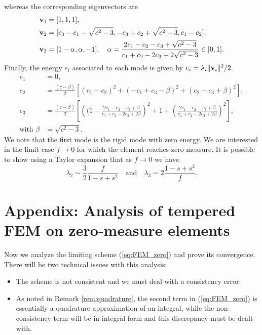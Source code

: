 \documentclass{article}
\theoremstyle{remark}
\begin{document}
whereas the corresponding eigenvectors are
\begin{align}
    {\bf v}_1 & = [ 1, 1, 1], \nonumber \\
    {\bf v}_2 & = [ c_3 - c_1 - \sqrt{c^2 - 3}, -c_3 + c_2 + \sqrt{c^2 - 3} , c_1 - c_2], \nonumber \\
    {\bf v}_3 & = [ 1 - \alpha,  \alpha, -1], \quad \alpha = \frac{2 c_1 -c_2 - c_3   + \sqrt{c^2 - 3}}{c_1 + c_2 - 2 c_3 + 2 \sqrt{c^2 - 3}} \in [0,1].\nonumber 
\end{align}
Finally, the energy $e_i$ associated to each mode is given by $e_i =  \lambda_i \| {\bf v}_i \|^2/2 $.
\begin{align*}
e_1&= 0, \\
e_2&=\frac{(c - \beta)}{2} \left[(c_1 - c_2)^2 + (-c_1 + c_3 - \beta)^2 + (c_2 - c_3 + \beta)^2\right], \\
e_3&= \frac{(c - \beta)}{2} \left[\left((1 - \frac{2c_1 - c_2 - c_3 + \beta}{c_1 + c_2 - 2c_3 + 2\beta}\right)^2 + 1 + \left( \frac{2c_1 - c_2 - c_3 + \beta}{c_1 + c_2 - 2c_3 + 2\beta} \right)^2\right], \\
\text{with } \beta &= \sqrt{c^2 - 3}.
\end{align*}
We note that the first mode is the rigid
mode with zero energy.
We are interested in the limit case  
$f \rightarrow
0$ for which the element reaches zero measure. 
It is possible to show using a Taylor expansion that as $f \rightarrow 0$ we have
\begin{equation}{\lambda_2 \sim \frac{3}{2} \frac{f}{1-s+s^2}
    \quad \text{and} \quad \lambda_3 \sim  2 \frac{ 1 - s + s^2}{f}}. 
\label{eq:eig_bis}
  \end{equation}

\section{Appendix: Analysis of tempered FEM on zero-measure elements} \label{apx:zero_tfem}
Now we analyze the limiting scheme (\ref{eq:FEM_zero}) and prove its convergence. There will be two technical issues with this analysis:
\begin{itemize}
\item The scheme is not consistent and we must deal with a consistency error.
\item As noted in Remark \ref{rem:quadrature}, the second term in (\ref{eq:FEM_zero}) is essentially a quadrature approximation of an integral, while the non-consistency term will be in integral form and this discrepancy must be dealt with.
\end{itemize}
\end{document}
